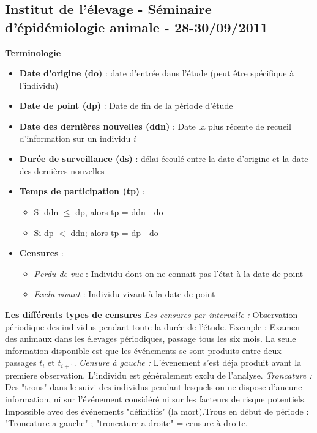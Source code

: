 \subsection{Institut de l'élevage - Séminaire d'épidémiologie animale - 28-30/09/2011}
\textbf{Terminologie}
\begin{itemize}
\item \textbf{Date d'origine (do)} : date d'entrée dans l'étude (peut être spécifique à l'individu)
\item \textbf{Date de point (dp)} : Date de fin de la période d'étude 
\item \textbf{Date des dernières nouvelles (ddn)} : Date la plus récente de recueil d'information sur un individu $i$
\item \textbf{Durée de surveillance (ds)} : délai écoulé entre la date d'origine et la date des dernières nouvelles
\item \textbf{Temps de participation (tp)} : 
\begin{itemize}
\item Si ddn $\leq$ dp, alors tp = ddn - do
\item Si dp $<$ ddn; alors tp = dp - do
\end{itemize}
\item \textbf{Censures} : 
\begin{itemize}
\item \textit{Perdu de vue} : Individu dont on ne connait pas l'état à la date de point
\item \textit{Exclu-vivant} : Individu vivant à la date de point
\end{itemize}
\end{itemize}
\textbf{Les différents types de censures}\newline
\textit{Les censures par intervalle : } Observation périodique des individus pendant toute la durée de l'étude. Exemple : Examen des animaux dans les élevages périodiques, passage tous les six mois.
La seule information disponible est que les événements se sont produits entre deux passages $t_{i}$ et $t_{i+1}$.\newline
\textit{Censure à gauche :} L'évenement s'est déja produit avant la premiere observation. L'individu est généralement exclu de l'analyse.\newline
\textit{Troncature : } Des "trous" dans le suivi des individus pendant lesquels on ne dispose d'aucune information, ni sur l'événement considéré ni sur les facteurs de risque potentiels. Impossible avec des événements "définitifs" (la mort).Trous en début de période : "Troncature a gauche" ; "troncature a droite" = censure à droite.\newline
